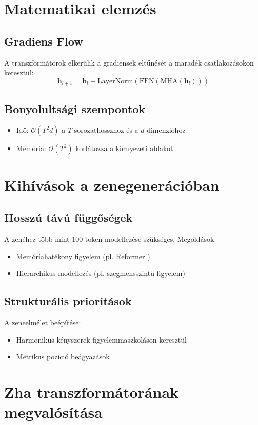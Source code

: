 \section {Matematikai elemzés}
\subsection{Gradiens Flow}
A transzformátorok elkerülik a gradiensek eltűnését a maradék csatlakozásokon keresztül:
\[
\mathbf{h}_{l+1} = \mathbf{h}_l + \text{LayerNorm}(\text{FFN}(\text{MHA}(\mathbf{h}_l)))
\]

\subsection{Bonyolultsági szempontok}
\begin{itemize}
    \item Idő: $\mathcal{O}(T^2d)$ a $T$ sorozathosszhoz és a $d$ dimenzióhoz
    \item Memória: $\mathcal{O}(T^2)$ korlátozza a környezeti ablakot
\end{itemize}

\section{Kihívások a zenegenerációban}
\subsection{Hosszú távú függőségek}
A zenéhez több mint 100 token modellezése szükséges. Megoldások:
\begin{itemize}
    \item Memóriahatékony figyelem (pl. Reformer \cite{kitaev2020reformer})
    \item Hierarchikus modellezés (pl. szegmensszintű figyelem)
\end{itemize}

\subsection{Strukturális prioritások}
A zeneelmélet beépítése:
\begin{itemize}
    \item Harmonikus kényszerek figyelemmaszkoláson keresztül
    \item Metrikus pozíció beágyazások
\end{itemize}

\section{Zha transzformátorának megvalósítása}
